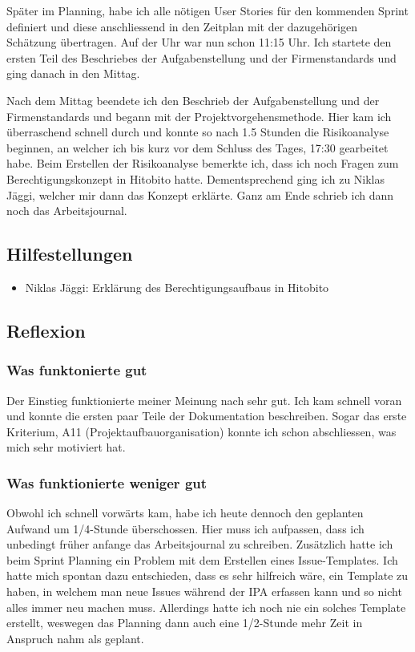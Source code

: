 Später im Planning, habe ich alle nötigen User Stories für den kommenden Sprint definiert und diese anschliessend in den Zeitplan mit der dazugehörigen Schätzung übertragen.
Auf der Uhr war nun schon 11:15 Uhr. Ich startete den ersten Teil des Beschriebes der Aufgabenstellung und der Firmenstandards und ging danach in den Mittag.

Nach dem Mittag beendete ich den Beschrieb der Aufgabenstellung und der Firmenstandards und begann mit der Projektvorgehensmethode. Hier kam ich überraschend schnell durch und konnte so
nach 1.5 Stunden die Risikoanalyse beginnen, an welcher ich bis kurz vor dem Schluss des Tages, 17:30 gearbeitet habe. Beim Erstellen der Risikoanalyse bemerkte ich, dass ich noch Fragen
zum Berechtigungskonzept in Hitobito hatte. Dementsprechend ging ich zu Niklas Jäggi, welcher mir dann das Konzept erklärte.
Ganz am Ende schrieb ich dann noch das Arbeitsjournal.

\subsection*{Hilfestellungen}
\begin{itemize}
    \item Niklas Jäggi: Erklärung des Berechtigungsaufbaus in Hitobito
\end{itemize}

\subsection*{Reflexion}

\subsubsection*{Was funktonierte gut}
Der Einstieg funktionierte meiner Meinung nach sehr gut. Ich kam schnell voran und konnte die ersten paar Teile der Dokumentation
beschreiben. Sogar das erste Kriterium, A11 (Projektaufbauorganisation) konnte ich schon abschliessen, was mich sehr motiviert hat. 

\subsubsection*{Was funktionierte weniger gut}
Obwohl ich schnell vorwärts kam, habe ich heute dennoch den geplanten Aufwand um 1/4-Stunde überschossen. Hier muss ich aufpassen, dass ich unbedingt früher anfange das
Arbeitsjournal zu schreiben. Zusätzlich hatte ich beim Sprint Planning ein Problem mit dem Erstellen eines Issue-Templates. Ich hatte mich spontan dazu entschieden,
dass es sehr hilfreich wäre, ein Template zu haben, in welchem man neue Issues während der IPA erfassen kann und so nicht alles immer neu machen muss. Allerdings hatte ich noch 
nie ein solches Template erstellt, weswegen das Planning dann auch eine 1/2-Stunde mehr Zeit in Anspruch nahm als geplant.

